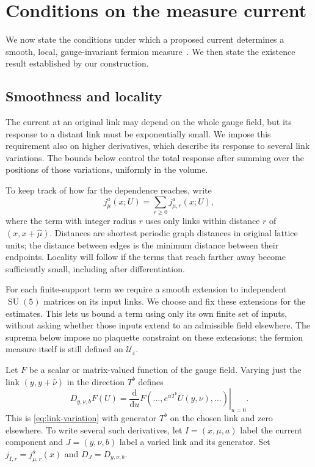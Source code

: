 \documentclass[11pt,a4paper]{article}
\theoremstyle{remark}
\DeclareMathOperator{\SU}{SU}
\newcommand{\dd}{\mathrm d}
\newcommand{\eps}{\varepsilon}
\begin{document}
\section{Conditions on the measure current}
\label{sec:measure}

We now state the conditions under which a proposed current
determines a smooth, local, gauge-invariant fermion
measure~\cite{LuscherNonabelian}. We then state the
existence result established by our construction.

\subsection{Smoothness and locality}
\label{sec:locality-definition}

The current at an original link may depend on the whole gauge
field, but its response to a distant link must be exponentially
small. We impose this requirement also on higher derivatives,
which describe its response to several link variations. The
bounds below control the total response after summing over
the positions of those variations, uniformly in the volume.

To keep track of how far the dependence reaches, write
\begin{equation}
 j_\mu^a(x;U)=\sum_{r\ge0}j_{\mu,r}^a(x;U),
\end{equation}
where the term with integer radius \(r\) uses only links
within distance \(r\) of \((x,x+\hat\mu)\).
Distances are shortest periodic graph distances in original
lattice units; the distance between edges is the minimum
distance between their endpoints. Locality will follow if
the terms that reach farther away become sufficiently small,
including after differentiation.

For each finite-support term we require a smooth extension
to independent \(\SU(5)\) matrices on its input links.
We choose and fix these extensions for the estimates.
This lets us bound a term using only its own finite set of
inputs, without asking whether those inputs extend to an
admissible field elsewhere. The suprema below impose no
plaquette constraint on these extensions; the fermion measure
itself is still defined on \(\mathcal U_\eps\).

Let \(F\) be a scalar or matrix-valued function of the gauge
field. Varying just the link \((y,y+\hat\nu)\) in the
direction \(T^b\) defines
\begin{equation}
 D_{y,\nu,b}F(U)=
 \left.\frac{\dd}{\dd u}
 F(\ldots,e^{uT^b}U(y,\nu),\ldots)\right|_{u=0}.
 \label{eq:link-derivative}
\end{equation}
This is \eqref{eq:link-variation} with generator \(T^b\)
on the chosen link and zero elsewhere. To write several
such derivatives, let \(I=(x,\mu,a)\) label the current
component and \(J=(y,\nu,b)\) label a varied link and its
generator. Set \(j_{I,r}=j_{\mu,r}^a(x)\) and
\(D_J=D_{y,\nu,b}\).
\end{document}
